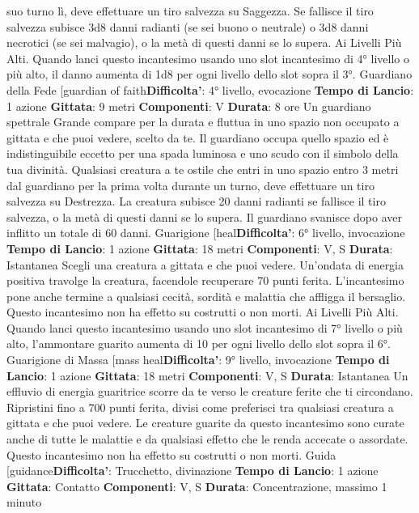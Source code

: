 \begin{multicols}{2}
suo turno lì, deve effettuare un tiro salvezza su
Saggezza. Se fallisce il tiro salvezza subisce 3d8 danni
radianti (se sei buono o neutrale) o 3d8 danni necrotici
(se sei malvagio), o la metà di questi danni se lo
supera.
Ai Livelli Più Alti. Quando lanci questo incantesimo
usando uno slot incantesimo di 4° livello o più alto, il
danno aumenta di 1d8 per ogni livello dello slot sopra il
3°.
Guardiano della Fede
[guardian of faith\textbf{Difficolta'}:
4° livello, evocazione
\textbf{Tempo di Lancio}: 1 azione
\textbf{Gittata}: 9 metri
\textbf{Componenti}: V
\textbf{Durata}: 8 ore
Un guardiano spettrale Grande compare per la durata e
fluttua in uno spazio non occupato a gittata e che puoi
vedere, scelto da te. Il guardiano occupa quello spazio
ed è indistinguibile eccetto per una spada luminosa e
uno scudo con il simbolo della tua divinità.
Qualsiasi creatura a te ostile che entri in uno spazio
entro 3 metri dal guardiano per la prima volta durante
un turno, deve effettuare un tiro salvezza su Destrezza.
La creatura subisce 20 danni radianti se fallisce il tiro
salvezza, o la metà di questi danni se lo supera. Il
guardiano svanisce dopo aver inflitto un totale di 60
danni.
Guarigione
[heal\textbf{Difficolta'}:
6° livello, invocazione
\textbf{Tempo di Lancio}: 1 azione
\textbf{Gittata}: 18 metri
\textbf{Componenti}: V, S
\textbf{Durata}: Istantanea
Scegli una creatura a gittata e che puoi vedere.
Un’ondata di energia positiva travolge la creatura,
facendole recuperare 70 punti ferita. L’incantesimo
pone anche termine a qualsiasi cecità, sordità e
malattia che affligga il bersaglio. Questo incantesimo
non ha effetto su costrutti o non morti.
Ai Livelli Più Alti. Quando lanci questo incantesimo
usando uno slot incantesimo di 7° livello o più alto,
l’ammontare guarito aumenta di 10 per ogni livello dello
slot sopra il 6°.
Guarigione di Massa
[mass heal\textbf{Difficolta'}:
9° livello, invocazione
\textbf{Tempo di Lancio}: 1 azione
\textbf{Gittata}: 18 metri
\textbf{Componenti}: V, S
\textbf{Durata}: Istantanea
Un effluvio di energia guaritrice scorre da te verso le
creature ferite che ti circondano. Ripristini fino a 700
punti ferita, divisi come preferisci tra qualsiasi creatura
a gittata e che puoi vedere. Le creature guarite da
questo incantesimo sono curate anche di tutte le
malattie e da qualsiasi effetto che le renda accecate o
assordate. Questo incantesimo non ha effetto su
costrutti o non morti.
Guida
[guidance\textbf{Difficolta'}:
Trucchetto, divinazione
\textbf{Tempo di Lancio}: 1 azione
\textbf{Gittata}: Contatto
\textbf{Componenti}: V, S
\textbf{Durata}: Concentrazione, massimo 1 minuto

\end{multicols}
